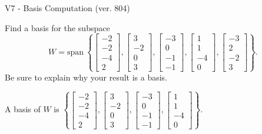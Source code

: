 \begin{exercise}
  \begin{exerciseTitle}V7 - Basis Computation (ver. 804)\end{exerciseTitle}
  \begin{exerciseStatement}
    Find a basis for the subspace 
\[W=\mathrm{span}\ \left\{\left[\begin{array}{r}
-2 \\
-2 \\
-4 \\
2
\end{array}\right] , \left[\begin{array}{r}
3 \\
-2 \\
0 \\
3
\end{array}\right] , \left[\begin{array}{r}
-3 \\
0 \\
-1 \\
-1
\end{array}\right] , \left[\begin{array}{r}
1 \\
1 \\
-4 \\
0
\end{array}\right] , \left[\begin{array}{r}
-3 \\
2 \\
-2 \\
3
\end{array}\right]\right\}.\]
 Be sure to explain why your result is a basis.


  \end{exerciseStatement}
  \begin{exerciseAnswer}
   A basis of \(W\) is  \(\left\{\left[\begin{array}{r}
-2 \\
-2 \\
-4 \\
2
\end{array}\right] , \left[\begin{array}{r}
3 \\
-2 \\
0 \\
3
\end{array}\right] , \left[\begin{array}{r}
-3 \\
0 \\
-1 \\
-1
\end{array}\right] , \left[\begin{array}{r}
1 \\
1 \\
-4 \\
0
\end{array}\right]\right\}\).
  


  \end{exerciseAnswer}
\end{exercise}